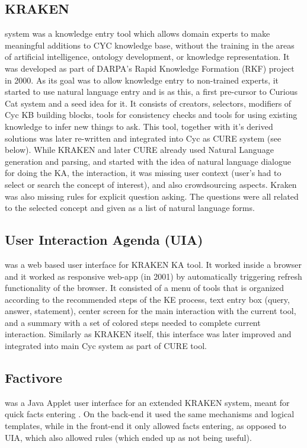 \subsection{KRAKEN} system was a knowledge entry tool which allows domain experts to
make meaningful additions to CYC knowledge base, without the training in the 
areas of artificial intelligence, ontology development, or knowledge
representation\parencite{Panton2002a}. It was developed as part of DARPA's
Rapid Knowledge Formation (RKF) project in 2000. As its goal was to allow
knowledge entry to non-trained experts, it started to use natural language 
entry and is as this, a first pre-cursor to Curious Cat system and a seed idea
for it. It consists of creators, selectors, modifiers of Cyc KB building blocks,
tools for consistency checks and tools for using existing knowledge to infer new
things to ask. This tool, together with it's derived solutions was later 
re-written and integrated into Cyc as CURE system (see below). While KRAKEN and
later CURE already used Natural Language generation and parsing, and started 
with the idea of natural language dialogue for doing the KA, the interaction, it
was missing user context (user's had to select or search the concept of 
interest), and also crowdsourcing aspects. Kraken was also missing rules for
explicit question asking. The questions were all related to the selected concept
and given as a list of natural language forms.

\subsection{User Interaction Agenda (UIA)} was a web  based user interface for KRAKEN
KA tool\parencite{Panton2002a,Witbrock2003UIA}. It worked inside a browser and 
it worked as responsive web-app (in 2001) by automatically triggering refresh 
functionality of the browser. It consisted of a menu of tools that is organized
according to the recommended steps of the KE process, text entry box (query, 
answer, statement), center screen for the main interaction with the current 
tool, and a summary with a set of colored steps needed to complete current 
interaction. Similarly as KRAKEN itself, this interface was later improved
and integrated into main Cyc system as part of CURE tool. 

\subsection{Factivore} was a Java Applet user interface for an extended KRAKEN system,
meant for quick facts entering \parencite{Witbrock2005}. On the back-end it used
the same mechanisms and logical templates, while in the front-end it only
allowed facts entering, as opposed to UIA, which also allowed rules (which
ended up as not being useful).

